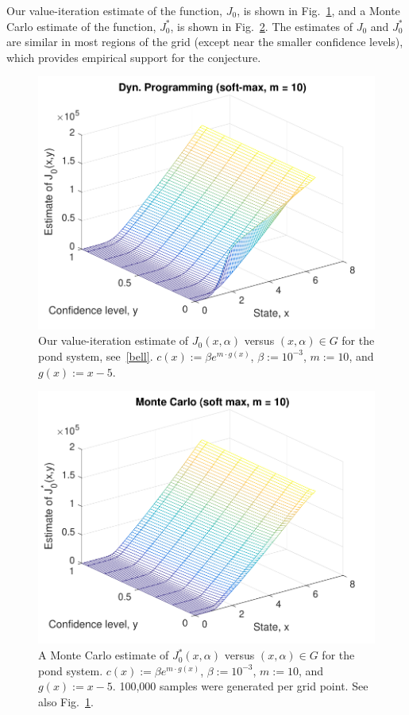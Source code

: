 \documentclass[letterpaper, 10 pt, conference]{ieeeconf}  %
\begin{document}
Our value-iteration estimate of the function, $J_0$, is shown in Fig.~\ref{J0dp}, and a Monte Carlo estimate of the function, $J_0^*$, is shown in Fig.~\ref{J0mc}.
The estimates of $J_0$ and $J_0^*$ are similar in most regions of the grid (except near the smaller confidence levels),
which provides empirical support for the conjecture.
 
\begin{figure}[thpb]
      \centering
      \includegraphics[scale=0.5]{dyn_prog_J0_sept112018.pdf}
      \caption{Our value-iteration estimate of $J_0(x,\alpha)$ versus $(x, \alpha) \in G$ for the pond system, see~\eqref{bell}.
	  $c(x) := \beta e^{m\cdot g(x)}$, $\beta := 10^{-3}$, $m := 10$, and $g(x) := x-5$.}
      \label{J0dp}
\end{figure}

\begin{figure}[thpb]
      \centering
      \includegraphics[scale=0.5]{monte_carlo_sum_sept112018.pdf}
      \caption{A Monte Carlo estimate of $J_0^*(x, \alpha)$ versus $(x, \alpha) \in G$ for the pond system.
	  $c(x) := \beta e^{m \cdot g(x)}$, $\beta := 10^{-3}$, $m := 10$, and $g(x) := x-5$.
	  100,000 samples were generated per grid point. See also Fig.~\ref{J0dp}.}
      \label{J0mc}
\end{figure}
\end{document}
